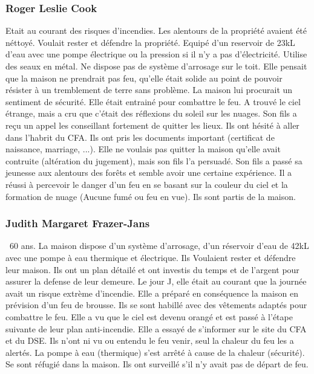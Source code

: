             \subsubsection{Roger Leslie Cook}
                Etait au courant des risques d'incendies.
                Les alentours de la propriété avaient été néttoyé.
                Voulait rester et défendre la propriété.
                Equipé d'un reservoir de 23kL d'eau avec une pompe électrique ou la pression si il n'y a pas d'électricité.
                Utilise des seaux en métal.
                Ne dispose pas de système d'arrosage sur le toit.
                Elle pensait que la maison ne prendrait pas feu, qu'elle était solide au point de pouvoir résister à un tremblement
                de terre sans problème. La maison lui procurait un sentiment de sécurité.
                Elle était entrainé pour combattre le feu.
                A trouvé le ciel étrange, mais a cru que c'était des réflexions du soleil sur les nuages.
                Son fils a reçu un appel les conseillant fortement de quitter les lieux.
                Ils ont hésité à aller dans l'habrit du CFA.
                Ils ont pris les documents important (certificat de naissance, marriage, ...).
                Elle ne voulais pas quitter la maison qu'elle avait contruite (altération du jugement), mais son fils l'a persuadé.
                Son fils a passé sa jeunesse aux alentours des forêts et semble avoir une certaine expérience. Il a réussi à percevoir
                le danger d'un feu en se basant sur la couleur du ciel et la formation de nuage (Aucune fumé ou feu en vue).
                Ils sont partis de la maison.

            \subsubsection{Judith Margaret Frazer-Jans}
                ~60 ans.
                La maison dispose d'un système d'arrosage, d'un réservoir d'eau de 42kL avec une pompe à eau thermique et électrique.
                Ils Voulaient rester et défendre leur maison. Ils ont un plan détailé et ont investis du temps et de l'argent pour
                assurer la defense de leur demeure.
                Le jour J, elle était au courant que la journée avait un risque extrème d'incendie. Elle a préparé en conséquence la
                maison en prévision d'un feu de brousse. Ils se sont habillé avec des vêtements adaptés pour combattre le feu.
                Elle a vu que le ciel est devenu orangé et est passé à l'étape suivante de leur plan anti-incendie. Elle a essayé de
                s'informer sur le site du CFA et du DSE.
                Ils n'ont ni vu ou entendu le feu venir, seul la chaleur du feu les a alertés.
                La pompe à eau (thermique) s'est arrêté à cause de la chaleur (sécurité).
                Se sont réfugié dans la maison.
                Ils ont surveillé s'il n'y avait pas de départ de feu.

